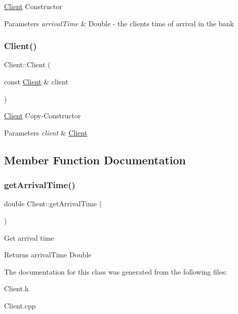 \hyperlink{classClient}{Client} Constructor 
\begin{DoxyParams}{Parameters}
{\em arrival\+Time} & Double -\/ the client\textquotesingle{}s time of arrival in the bank \\
\hline
\end{DoxyParams}
\mbox{\label{classClient_ab74cbe8124ada5342d56030bd608876b}} 
\subsubsection{\texorpdfstring{Client()}{Client()}\hspace{0.1cm}{\footnotesize\ttfamily [2/2]}}
{\footnotesize\ttfamily Client\+::\+Client (\begin{DoxyParamCaption}\item[{const \hyperlink{classClient}{Client} \&}]{client }\end{DoxyParamCaption})}

\hyperlink{classClient}{Client} Copy-\/\+Constructor 
\begin{DoxyParams}{Parameters}
{\em client} & \hyperlink{classClient}{Client} \\
\hline
\end{DoxyParams}


\subsection{Member Function Documentation}
\mbox{\label{classClient_a748d86e8c875f10a5d92c3cf2a12e621}} 
\subsubsection{\texorpdfstring{get\+Arrival\+Time()}{getArrivalTime()}}
{\footnotesize\ttfamily double Client\+::get\+Arrival\+Time (\begin{DoxyParamCaption}{ }\end{DoxyParamCaption})}

Get arrival time \begin{DoxyReturn}{Returns}
arrival\+Time Double 
\end{DoxyReturn}


The documentation for this class was generated from the following files\+:\begin{DoxyCompactItemize}
\item 
Client.\+h\item 
Client.\+cpp\end{DoxyCompactItemize}
